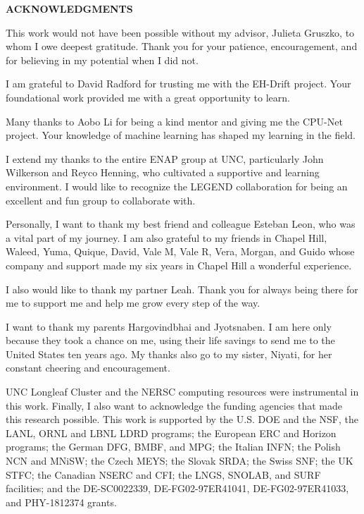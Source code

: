 \begin{center}
\vspace*{52pt}
{\normalfont \textbf{ACKNOWLEDGMENTS}}
\end{center}

This work would not have been possible without my advisor, Julieta Gruszko, to whom I owe deepest gratitude. Thank you for your patience, encouragement, and for believing in my potential when I did not.

I am grateful to David Radford for trusting me with the EH-Drift project. Your foundational work provided me with a great opportunity to learn. 

Many thanks to Aobo Li for being a kind mentor and giving me the CPU-Net project. Your knowledge of machine learning has shaped my learning in the field.

I extend my thanks to the entire ENAP group at UNC, particularly John Wilkerson and Reyco Henning, who cultivated a supportive and learning environment. I would like to recognize the LEGEND collaboration for being an excellent and fun group to collaborate with. 

Personally, I want to thank my best friend and colleague Esteban Leon, who was a vital part of my journey. I am also grateful to my friends in Chapel Hill, Waleed, Yuma, Quique, David, Vale M, Vale R, Vera, Morgan, and Guido whose company and support made my six years in Chapel Hill a wonderful experience.

I also would like to thank my partner Leah. Thank you for always being there for me to support me and help me grow every step of the way.

I want to thank my parents Hargovindbhai and Jyotsnaben. I am here only because they took a chance on me, using their life savings to send me to the United States ten years ago. My thanks also go to my sister, Niyati, for her constant cheering and encouragement.

UNC Longleaf Cluster and the NERSC computing resources were instrumental in this work. Finally, I also want to acknowledge the funding agencies that made this research possible. This work is supported by the U.S. DOE and the NSF, the LANL, ORNL and LBNL LDRD programs; the European ERC and Horizon programs; the German DFG, BMBF, and MPG; the Italian INFN; the Polish NCN and MNiSW; the Czech MEYS; the Slovak SRDA; the Swiss SNF; the UK STFC; the Canadian NSERC and CFI; the LNGS, SNOLAB, and SURF facilities; and the DE-SC0022339, DE-FG02-97ER41041, DE-FG02-97ER41033, and PHY-1812374 grants.

\clearpage